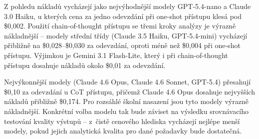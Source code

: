 Z pohledu nákladů vycházejí jako nejvýhodnější modely GPT-5.4-nano a Claude 3.0 Haiku, u kterých cena za jedno odevzdání při one-shot přístupu klesá pod \$0,002.
Použití chain-of-thought přístupu se třemi kroky analýzy je výrazně nákladnější -- modely střední třídy (Claude 3.5 Haiku, GPT-5.4-mini) vycházejí přibližně na \$0,028--\$0,030 za odevzdání, oproti méně než \$0,004 při one-shot přístupu.
Výjimkou je Gemini 3.1 Flash-Lite, který i při chain-of-thought přístupu dosahuje nákladů okolo \$0,01 za odevzdání.

Nejvýkonnější modely (Claude 4.6 Opus, Claude 4.6 Sonnet, GPT-5.4) přesahují \$0,10 za odevzdání u CoT přístupu, přičemž Claude 4.6 Opus dosahuje nejvyšších nákladů přibližně \$0,174.
Pro rozsáhlé školní nasazení jsou tyto modely výrazně nákladnější.
Konkrétní volba modelu tak bude záviset na výsledku srovnávacího testování kvality výstupů -- z~čistě cenového hlediska vycházejí nejlépe menší modely, pokud jejich analytická kvalita pro dané požadavky bude dostatečná.

\endinput